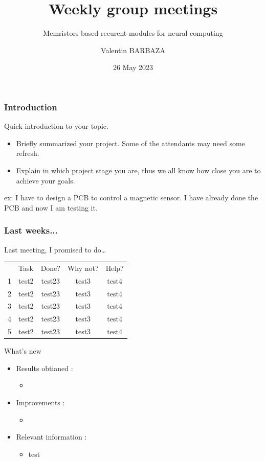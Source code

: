 \documentclass[table]{beamer}
\title[Group Meeting]
{Weekly group meetings}
\subtitle{Memristors-based recurent modules for neural computing}
\author[V. BARBAZA]{Valentin BARBAZA}
\date[26 May] %
{26 May 2023}
\begin{document}
\frame{\titlepage}


\begin{frame}
  \frametitle{Introduction}
  Quick introduction to your topic.

  \begin{itemize}
      \color{text}
    \item Briefly summarized your project. Some of the attendants may need some refresh.
    \item Explain in which project stage you are, thus we all know how close you are to achieve your goals.
  \end{itemize}

  ex: I have to design a PCB to control a magnetic sensor. I have already done the PCB and now I am testing it.
\end{frame}


\begin{frame}
  \frametitle{Last weeks...}

  Last meeting, I promised to do…

  \centering
  \begin{tabular}{ c m{3cm} c c c }
    \rowcolor{firstRow}
    & \centering\color{white}Task & \color{white}Done? & \color{white}Why not? & \color{white}Help? \\
    1 & test2 & test23 & test3 & test4\\
    2 & test2 & test23 & test3 & test4\\
    3 & test2 & test23 & test3 & test4\\
    4 & test2 & test23 & test3 & test4\\
    5 & test2 & test23 & test3 & test4\\
  \end{tabular}

\end{frame}

\begin{frame}{What's new}
  \begin{itemize}
    \item Results obtianed :
      \begin{itemize}
          \color{text}
        \item
      \end{itemize}
    \item Improvements :
      \begin{itemize}
          \color{text}
        \item
      \end{itemize}
    \item Relevant information :
      \begin{itemize}
          \color{text}
        \item test
      \end{itemize}
  \end{itemize}
\end{frame}
\end{document}
